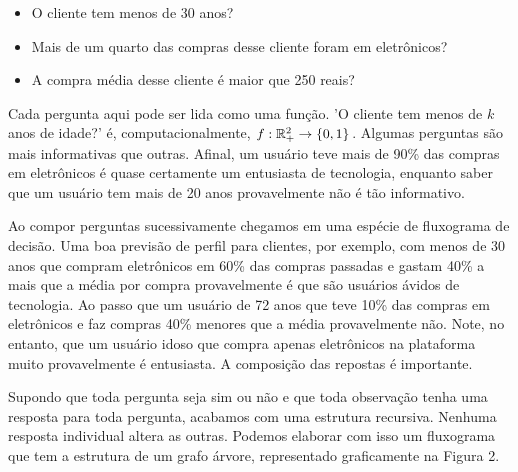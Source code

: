\begin{itemize}
    \item O cliente tem menos de 30 anos?
    \item Mais de um quarto das compras desse cliente foram em eletrônicos?
    \item A compra média desse cliente é maior que 250 reais?
\end{itemize}

Cada pergunta aqui pode ser lida como uma função. 'O cliente tem menos de $k$ anos de idade?' é, computacionalmente,  $f: \mathbb{R}^2_+ \to \{0, 1\}$. Algumas perguntas são mais informativas que outras. Afinal, um usuário teve mais de 90\% das compras em eletrônicos é quase certamente um entusiasta de tecnologia, enquanto saber que um usuário tem mais de 20 anos provavelmente não é tão informativo. 

Ao compor perguntas sucessivamente chegamos em uma espécie de fluxograma de decisão. Uma boa previsão de perfil para clientes, por exemplo, com menos de 30 anos que compram eletrônicos em 60\% das compras passadas e gastam 40\% a mais que a média por compra provavelmente é que são usuários ávidos de tecnologia. Ao passo que um usuário de 72 anos que teve 10\% das compras em eletrônicos e faz compras 40\% menores que a média provavelmente não. Note, no entanto, que um usuário idoso que compra apenas eletrônicos na plataforma muito provavelmente é entusiasta. A composição das repostas é importante.

Supondo que toda pergunta seja sim ou não e que toda observação tenha uma resposta para toda pergunta, acabamos com uma estrutura recursiva. Nenhuma resposta individual altera as outras. Podemos elaborar com isso um fluxograma que tem a estrutura de um grafo árvore, representado graficamente na Figura 2. 


\begin{figure}[H]
    \centering
        \label{fig:arvore}
\end{figure}


